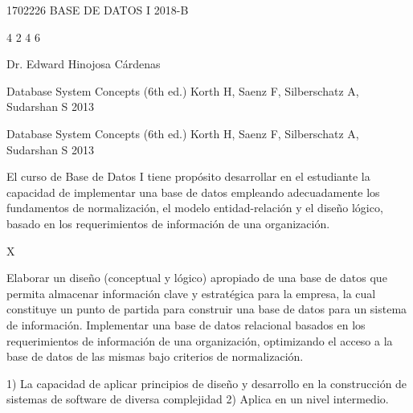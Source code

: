\documentclass[12pt]{article}
\begin{document}
\sylabusHeader
\sylabusTitle

\curso
{1702226} %
{BASE DE DATOS I} %
{2018-B} %

\creditosHoras
{4} %
{2} %
{} %
{} %
{4} %
{6} %

\instructor
{Dr. Edward Hinojosa Cárdenas}

\libro
{Database System Concepts (6th ed.)} %
{Korth H, Saenz F, Silberschatz A, Sudarshan S} %
{2013} %

\libroSecundario
{Database System Concepts (6th ed.)} %
{Korth H, Saenz F, Silberschatz A, Sudarshan S} %
{2013} %

\begin{datosCurso}
    \begin{descripcion}
        El curso de Base de Datos I tiene propósito desarrollar en el estudiante la capacidad de implementar una base de datos empleando adecuadamente los fundamentos de normalización, el modelo entidad-relación y el diseño lógico, basado en los requerimientos de información de una organización.
    \end{descripcion}
    \begin{requisitos}
    \end{requisitos}
    \ObligatorioElectivo
    {X} %
    {} %
\end{datosCurso}

\begin{objetivosCurso}
    \begin{resultadosEspecificos}
        Elaborar un diseño (conceptual y lógico) apropiado de una base de datos que permita almacenar información clave y estratégica para la empresa, la cual constituye un punto de partida para  construir una base de datos para un sistema de información. Implementar una base de datos relacional basados en los requerimientos de información de una organización, optimizando el acceso a la base de datos de las mismas bajo criterios de normalización.
    \end{resultadosEspecificos}
    \begin{resultadosEstudiante}
        1) La capacidad de aplicar principios de diseño y desarrollo en la construcción de sistemas de software de diversa complejidad 2) Aplica en un nivel intermedio.
    \end{resultadosEstudiante}
\end{objetivosCurso}

\begin{ListaTemas}
\end{ListaTemas}
\end{document}
